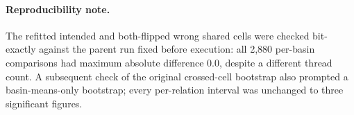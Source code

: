 
\paragraph{Reproducibility note.}
The refitted intended and both-flipped wrong shared cells were checked
bit-exactly against the parent run fixed before execution: all 2,880 per-basin comparisons had maximum
absolute difference $0.0$, despite a different thread count.  A subsequent
check of the original crossed-cell bootstrap also prompted a
basin-means-only bootstrap;
every per-relation interval was unchanged to three significant figures.


